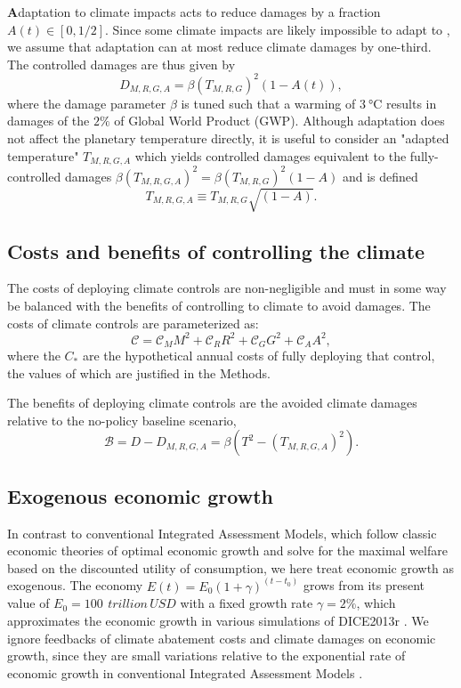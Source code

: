 \documentclass[9pt,twocolumn,twoside,lineno]{pnas-new}
\begin{document}
\textbf{A}daptation to climate impacts acts to reduce damages by a fraction $A(t) \in [0, 1/2]$. Since some climate impacts are likely impossible to adapt to \cite[][]{dow_limits_2013}, we assume that adaptation can at most reduce climate damages by one-third. The controlled damages are thus given by
\begin{equation}
    D_{M,R,G,A} = \beta (T_{M,R,G})^{2} (1-A(t)),
    \label{eq:damages}
\end{equation}
where the damage parameter $\beta$ is tuned such that a warming of $\SI{3}{\celsius}$ results in damages of the $2\%$ of Global World Product (GWP). Although adaptation does not affect the planetary temperature directly, it is useful to consider an "adapted temperature" $T_{M,R,G,A}$ which yields controlled damages equivalent to the fully-controlled damages $\beta (T_{M,R,G,A})^{2} = \beta (T_{M,R,G})^{2} (1-A)$ and is defined
\begin{equation}
    T_{M,R,G,A} \equiv T_{M,R,G} \sqrt{(1-A)}.\label{eq:adapted-temperature}
\end{equation}

\subsection*{Costs and benefits of controlling the climate}

The costs of deploying climate controls are non-negligible and must in some way be balanced with the benefits of controlling to climate to avoid damages. The costs of climate controls are parameterized as:
\begin{equation}
    \mathcal{C} = \mathcal{C}_{M} M^{2} + \mathcal{C}_{R} R^{2} + \mathcal{C}_{G} G^{2} + \mathcal{C}_{A} A^{2},
\end{equation}
where the $C_{*}$ are the hypothetical annual costs of fully deploying that control, the values of which are justified in the Methods.

The benefits of deploying climate controls are the avoided climate damages relative to the no-policy baseline scenario,
\begin{equation}
    \mathcal{B} = D - D_{M,R,G,A} = \beta (T^{2} - (T_{M,R,G,A})^{2}).
\end{equation}

\subsection*{Exogenous economic growth}
In contrast to conventional Integrated Assessment Models, which follow classic economic theories of optimal economic growth and solve for the maximal welfare based on the discounted utility of consumption, we here treat economic growth as exogenous. The economy $E(t) = E_{0}(1 + \gamma)^{(t-t_{0})}$ grows from its present value of $E_{0} = \SI{100}{\,trillion\, USD}$ with a fixed growth rate $\gamma = 2\%$, which approximates the economic growth in various simulations of DICE2013r \cite{nordhaus2013dice}. We ignore feedbacks of climate abatement costs and climate damages on economic growth, since they are small variations relative to the exponential rate of economic growth in conventional Integrated Assessment Models \cite{nordhaus2013dice}.
\end{document}
